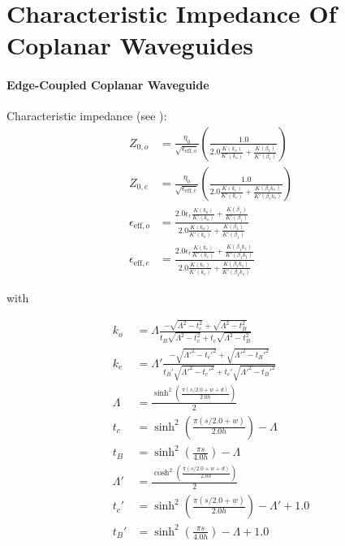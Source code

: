 \section{Characteristic Impedance Of Coplanar Waveguides} \label{app:waveguides}
\paragraph{Edge-Coupled Coplanar Waveguide}

Characteristic impedance (see \cite[~p197-198]{wadell}): 
\begin{align}
	Z_{0,o}                 & = \frac{\eta_0}{\sqrt{\epsilon_{\text{eff},o}}} \left( \frac{1.0}{2.0 \frac{K(k_o)}{K'(k_o)} + \frac{K(\beta_1)}{K'(\beta_1)}}\right)                        \\
	Z_{0,e}                 & = \frac{\eta_0}{\sqrt{\epsilon_{\text{eff},e}}} \left( \frac{1.0}{2.0 \frac{K(k_e)}{K'(k_e)} + \frac{K(\beta_1 k_1)}{K'(\beta_1 k_1)}}\right)                \\
	\epsilon_{\text{eff},o} & = \frac{2.0 \epsilon_r \frac{K(k_o)}{K'(k_o)} + \frac{K(\beta_1)}{K'(\beta_1)}}{2.0 \frac{K(k_o)}{K'(k_o)} + \frac{K(\beta_1)}{K'(\beta_1)}}                 \\
	\epsilon_{\text{eff},e} & = \frac{2.0 \epsilon_r \frac{K(k_e)}{K'(k_e)} + \frac{K(\beta_1 k_1)}{K'(\beta_1 k_1)}}{2.0 \frac{K(k_e)}{K'(k_e)} + \frac{K(\beta_1 k_1)}{K'(\beta_1 k_1)}}
\end{align}

with

\begin{align}
	k_o      & = \Lambda \frac{-\sqrt{\Lambda^2 - t_c^2} + \sqrt{\Lambda^2 - t_B^2}}{t_B\sqrt{\Lambda^2 - t_c^2} + t_c \sqrt{\Lambda^2 - t_B^2}}            \\
	k_e      & = \Lambda' \frac{-\sqrt{\Lambda'^2 - t_c'^2} + \sqrt{\Lambda'^2 - t_B'^2}}{t_B'\sqrt{\Lambda'^2 - t_c'^2} + t_c' \sqrt{\Lambda'^2 - t_B'^2}} \\
	\Lambda  & = \frac{\sinh^2 \left( \frac{\pi (s/2.0 + w + d)}{2.0 h} \right) }{2}                                                                        \\
	t_c      & = \sinh^2 \left( \frac{\pi (s/2.0 + w)}{2.0 h} \right) - \Lambda                                                                             \\
	t_B      & = \sinh^2 \left( \frac{\pi s}{4.0 h} \right) - \Lambda                                                                                       \\
	\Lambda' & = \frac{\cosh^2 \left( \frac{\pi (s/2.0 + w + d)}{2.0 h} \right) }{2}                                                                        \\
	t_c'     & = \sinh^2 \left( \frac{\pi (s/2.0 + w)}{2.0 h} \right) - \Lambda' + 1.0                                                                      \\
	t_B'     & = \sinh^2 \left( \frac{\pi s}{4.0 h} \right) - \Lambda + 1.0
\end{align}

